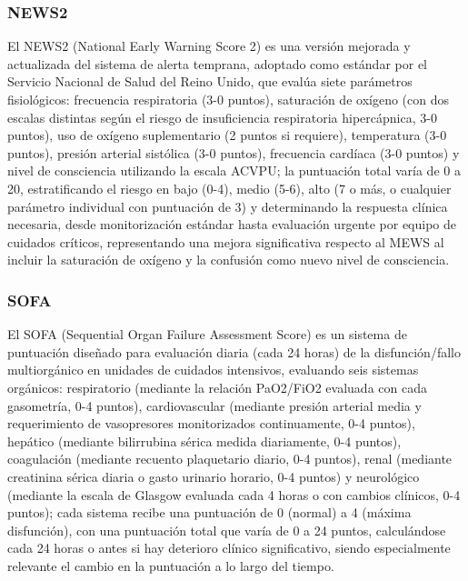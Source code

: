 \subsubsection{NEWS2}
El NEWS2 (National Early Warning Score 2) es una versión mejorada y actualizada del sistema de alerta temprana, adoptado como estándar por el Servicio Nacional de Salud del Reino Unido, 
que evalúa siete parámetros fisiológicos: frecuencia respiratoria (3-0 puntos), saturación de oxígeno (con dos escalas distintas según el riesgo de insuficiencia respiratoria hipercápnica, 3-0 puntos), 
uso de oxígeno suplementario (2 puntos si requiere), temperatura (3-0 puntos), presión arterial sistólica (3-0 puntos), frecuencia cardíaca (3-0 puntos) 
y nivel de consciencia utilizando la escala ACVPU; 
la puntuación total varía de 0 a 20, estratificando el riesgo en bajo (0-4), medio (5-6), alto (7 o más, o cualquier parámetro individual con puntuación de 3) y determinando la respuesta clínica necesaria, 
desde monitorización estándar hasta evaluación urgente por equipo de cuidados críticos, representando una mejora significativa respecto al MEWS al incluir la saturación de oxígeno 
y la confusión como nuevo nivel de consciencia.

\subsubsection{SOFA}
El SOFA (Sequential Organ Failure Assessment Score) es un sistema de puntuación diseñado para evaluación diaria (cada 24 horas) de la disfunción/fallo multiorgánico en unidades de cuidados intensivos, 
evaluando seis sistemas orgánicos: respiratorio (mediante la relación PaO2/FiO2 evaluada con cada gasometría, 0-4 puntos), 
cardiovascular (mediante presión arterial media y requerimiento de vasopresores monitorizados continuamente, 0-4 puntos), hepático (mediante bilirrubina sérica medida diariamente, 0-4 puntos), 
coagulación (mediante recuento plaquetario diario, 0-4 puntos), renal (mediante creatinina sérica diaria o gasto urinario horario, 0-4 puntos) 
y neurológico (mediante la escala de Glasgow evaluada cada 4 horas o con cambios clínicos, 0-4 puntos); 
cada sistema recibe una puntuación de 0 (normal) a 4 (máxima disfunción), con una puntuación total que varía de 0 a 24 puntos, calculándose cada 24 horas o antes si hay deterioro clínico significativo, 
siendo especialmente relevante el cambio en la puntuación a lo largo del tiempo.

